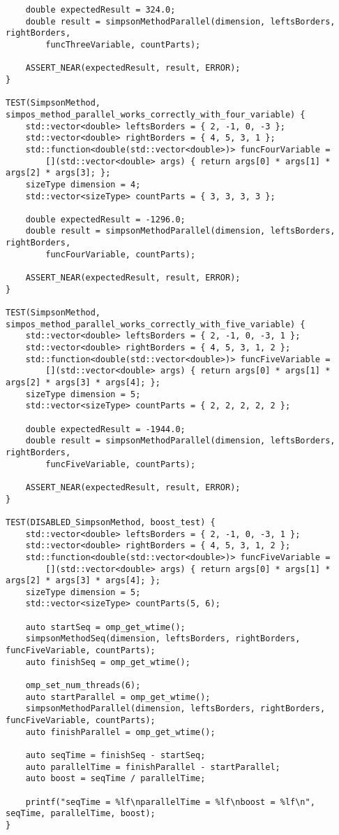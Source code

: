 \documentclass{report}
\begin{document}
\begin{lstlisting}
    double expectedResult = 324.0;
    double result = simpsonMethodParallel(dimension, leftsBorders, rightBorders,
        funcThreeVariable, countParts);

    ASSERT_NEAR(expectedResult, result, ERROR);
}

TEST(SimpsonMethod, simpos_method_parallel_works_correctly_with_four_variable) {
    std::vector<double> leftsBorders = { 2, -1, 0, -3 };
    std::vector<double> rightBorders = { 4, 5, 3, 1 };
    std::function<double(std::vector<double>)> funcFourVariable =
        [](std::vector<double> args) { return args[0] * args[1] * args[2] * args[3]; };
    sizeType dimension = 4;
    std::vector<sizeType> countParts = { 3, 3, 3, 3 };

    double expectedResult = -1296.0;
    double result = simpsonMethodParallel(dimension, leftsBorders, rightBorders,
        funcFourVariable, countParts);

    ASSERT_NEAR(expectedResult, result, ERROR);
}

TEST(SimpsonMethod, simpos_method_parallel_works_correctly_with_five_variable) {
    std::vector<double> leftsBorders = { 2, -1, 0, -3, 1 };
    std::vector<double> rightBorders = { 4, 5, 3, 1, 2 };
    std::function<double(std::vector<double>)> funcFiveVariable =
        [](std::vector<double> args) { return args[0] * args[1] * args[2] * args[3] * args[4]; };
    sizeType dimension = 5;
    std::vector<sizeType> countParts = { 2, 2, 2, 2, 2 };

    double expectedResult = -1944.0;
    double result = simpsonMethodParallel(dimension, leftsBorders, rightBorders,
        funcFiveVariable, countParts);

    ASSERT_NEAR(expectedResult, result, ERROR);
}

TEST(DISABLED_SimpsonMethod, boost_test) {
    std::vector<double> leftsBorders = { 2, -1, 0, -3, 1 };
    std::vector<double> rightBorders = { 4, 5, 3, 1, 2 };
    std::function<double(std::vector<double>)> funcFiveVariable =
        [](std::vector<double> args) { return args[0] * args[1] * args[2] * args[3] * args[4]; };
    sizeType dimension = 5;
    std::vector<sizeType> countParts(5, 6);

    auto startSeq = omp_get_wtime();
    simpsonMethodSeq(dimension, leftsBorders, rightBorders, funcFiveVariable, countParts);
    auto finishSeq = omp_get_wtime();

    omp_set_num_threads(6);
    auto startParallel = omp_get_wtime();
    simpsonMethodParallel(dimension, leftsBorders, rightBorders, funcFiveVariable, countParts);
    auto finishParallel = omp_get_wtime();

    auto seqTime = finishSeq - startSeq;
    auto parallelTime = finishParallel - startParallel;
    auto boost = seqTime / parallelTime;

    printf("seqTime = %lf\nparallelTime = %lf\nboost = %lf\n", seqTime, parallelTime, boost);
}

\end{lstlisting}
\end{document}
